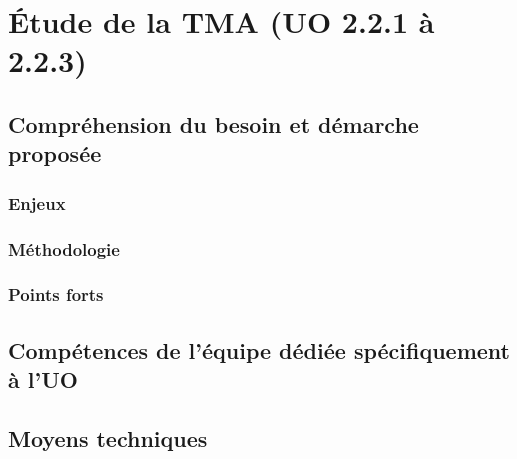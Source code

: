 
	\section{Étude de la TMA (UO 2.2.1 à 2.2.3)}
	\subsection{Compréhension du besoin et démarche proposée}
	\subsubsection{Enjeux}
	\subsubsection{Méthodologie}
	\subsubsection{Points forts}
	\subsection{Compétences de l'équipe dédiée spécifiquement à l'UO}
	\subsection{Moyens techniques}